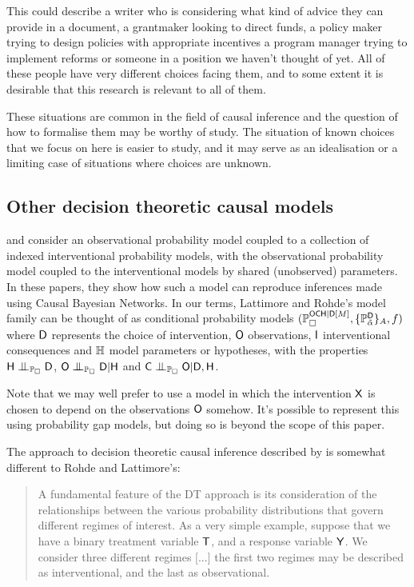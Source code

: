 This could describe a writer who is considering what kind of advice they can provide in a document, a grantmaker looking to direct funds, a policy maker trying to design policies with appropriate incentives a program manager trying to implement reforms or someone in a position we haven't thought of yet. All of these people have very different choices facing them, and to some extent it is desirable that this research is relevant to all of them.

These situations are common in the field of causal inference and the question of how to formalise them may be worthy of study. The situation of known choices that we focus on here is easier to study, and it may serve as an idealisation or a limiting case of situations where choices are unknown.

\subsection{Other decision theoretic causal models}

\citet{lattimore_causal_2019} and \citet{lattimore_replacing_2019} consider an observational probability model coupled to a collection of indexed interventional probability models, with the observational probability model coupled to the interventional models by shared (unobserved) parameters. In these papers, they show how such a model can reproduce inferences made using Causal Bayesian Networks. In our terms, Lattimore and Rohde's model family can be thought of as conditional probability models $(\mathbb{P}_\square^{\mathsf{OCH}|\mathsf{D}[M]},\{\mathbb{P}_{\tilde{\alpha}}^{\mathsf{D}}\}_A,f)$ where $\mathsf{D}$ represents the choice of intervention, $\mathsf{O}$ observations, $\mathsf{I}$ interventional consequences and $\mathbb{H}$ model parameters or hypotheses, with the properties $\RV{H}\CI_{\prob{P}_{\square}} \RV{D}$, $\RV{O}\CI_{\prob{P}_{\square}} \RV{D}|\RV{H}$ and $\RV{C}\CI_{\prob{P}_{\square}} \RV{O}|\RV{D},\RV{H}$.

Note that we may well prefer to use a model in which the intervention $\mathsf{X}$ is chosen to depend on the observations $\mathsf{O}$ somehow. It's possible to represent this using probability gap models, but doing so is beyond the scope of this paper.

The approach to decision theoretic causal inference described by \citet{dawid_decision-theoretic_2020} is somewhat different to Rohde and Lattimore's:

\begin{quote}
A fundamental feature of the DT approach is its consideration of the relationships between the various probability distributions that govern different regimes of interest. As a very simple example, suppose that we have a binary treatment variable $\mathsf{T}$, and a response variable $\mathsf{Y}$. We consider three different regimes [...] the first two regimes may be described as interventional, and the last as observational.
\end{quote}

